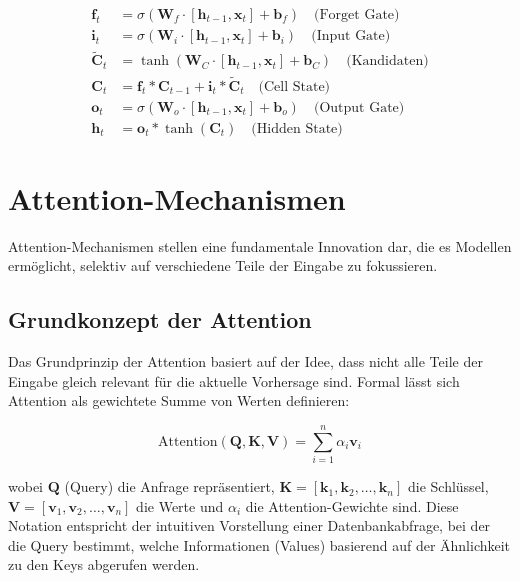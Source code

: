 \begin{align}
\mathbf{f}_t &= \sigma(\mathbf{W}_f \cdot [\mathbf{h}_{t-1}, \mathbf{x}_t] + \mathbf{b}_f) \quad \text{(Forget Gate)} \\
\mathbf{i}_t &= \sigma(\mathbf{W}_i \cdot [\mathbf{h}_{t-1}, \mathbf{x}_t] + \mathbf{b}_i) \quad \text{(Input Gate)} \\
\tilde{\mathbf{C}}_t &= \tanh(\mathbf{W}_C \cdot [\mathbf{h}_{t-1}, \mathbf{x}_t] + \mathbf{b}_C) \quad \text{(Kandidaten)} \\
\mathbf{C}_t &= \mathbf{f}_t * \mathbf{C}_{t-1} + \mathbf{i}_t * \tilde{\mathbf{C}}_t \quad \text{(Cell State)} \\
\mathbf{o}_t &= \sigma(\mathbf{W}_o \cdot [\mathbf{h}_{t-1}, \mathbf{x}_t] + \mathbf{b}_o) \quad \text{(Output Gate)} \\
\mathbf{h}_t &= \mathbf{o}_t * \tanh(\mathbf{C}_t) \quad \text{(Hidden State)}
\end{align}

\section{Attention-Mechanismen}

Attention-Mechanismen stellen eine fundamentale Innovation dar, die es Modellen ermöglicht, selektiv auf verschiedene Teile der Eingabe zu fokussieren.

\subsection{Grundkonzept der Attention}

Das Grundprinzip der Attention basiert auf der Idee, dass nicht alle Teile der Eingabe gleich relevant für die aktuelle Vorhersage sind. Formal lässt sich Attention als gewichtete Summe von Werten definieren:

\begin{equation}
\text{Attention}(\mathbf{Q}, \mathbf{K}, \mathbf{V}) = \sum_{i=1}^{n} \alpha_i \mathbf{v}_i
\end{equation}

wobei $\mathbf{Q}$ (Query) die Anfrage repräsentiert, $\mathbf{K} = [\mathbf{k}_1, \mathbf{k}_2, \ldots, \mathbf{k}_n]$ die Schlüssel, $\mathbf{V} = [\mathbf{v}_1, \mathbf{v}_2, \ldots, \mathbf{v}_n]$ die Werte und $\alpha_i$ die Attention-Gewichte sind. Diese Notation entspricht der intuitiven Vorstellung einer Datenbankabfrage, bei der die Query bestimmt, welche Informationen (Values) basierend auf der Ähnlichkeit zu den Keys abgerufen werden.

